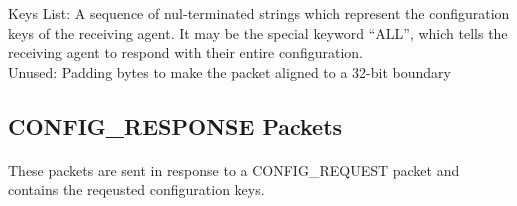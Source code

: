 \documentclass[11pt]{article}
\begin{document}
\newline
Keys List:  A sequence of nul-terminated strings which represent the configuration keys of the receiving agent.
It may be the special keyword “ALL”, which tells the receiving agent to respond with their entire configuration.\\
Unused: Padding bytes to make the packet aligned to a 32-bit boundary

\subsection {CONFIG\_RESPONSE Packets}
\paragraph{}
These packets are sent in response to a CONFIG\_REQUEST packet and contains the reqeusted configuration keys.
\newline
\end{document}
